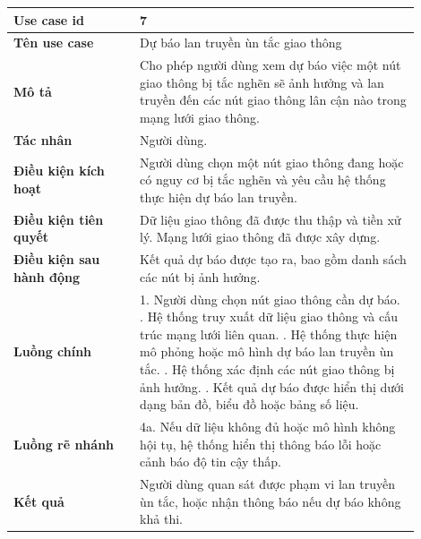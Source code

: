 \begin{table}[H]
\centering
\begin{tabular}{|p{0.28\linewidth}|p{0.62\linewidth}|}
\hline
\textbf{Use case id} & 7 \\ \hline

\textbf{Tên use case} & Dự báo lan truyền ùn tắc giao thông \\ \hline

\textbf{Mô tả} & 
Cho phép người dùng xem dự báo việc một nút giao thông bị tắc nghẽn sẽ ảnh hưởng và lan truyền đến các nút giao thông lân cận nào trong mạng lưới giao thông. \\ \hline

\textbf{Tác nhân} & Người dùng. \\ \hline

\textbf{Điều kiện kích hoạt} & 
Người dùng chọn một nút giao thông đang hoặc có nguy cơ bị tắc nghẽn và yêu cầu hệ thống thực hiện dự báo lan truyền. \\ \hline

\textbf{Điều kiện tiên quyết} &
Dữ liệu giao thông đã được thu thập và tiền xử lý. Mạng lưới giao thông đã được xây dựng. \\ \hline

\textbf{Điều kiện sau hành động} &
Kết quả dự báo được tạo ra, bao gồm danh sách các nút bị ảnh hưởng. \\ \hline

\textbf{Luồng chính} &
1. Người dùng chọn nút giao thông cần dự báo. \newline
2. Hệ thống truy xuất dữ liệu giao thông và cấu trúc mạng lưới liên quan. \newline
3. Hệ thống thực hiện mô phỏng hoặc mô hình dự báo lan truyền ùn tắc. \newline
4. Hệ thống xác định các nút giao thông bị ảnh hưởng. \newline
5. Kết quả dự báo được hiển thị dưới dạng bản đồ, biểu đồ hoặc bảng số liệu. \\ \hline

\textbf{Luồng rẽ nhánh} &
4a. Nếu dữ liệu không đủ hoặc mô hình không hội tụ, hệ thống hiển thị thông báo lỗi hoặc cảnh báo độ tin cậy thấp. \\ \hline

\textbf{Kết quả} &
Người dùng quan sát được phạm vi lan truyền ùn tắc, hoặc nhận thông báo nếu dự báo không khả thi. \\ \hline
\end{tabular}
\end{table}


